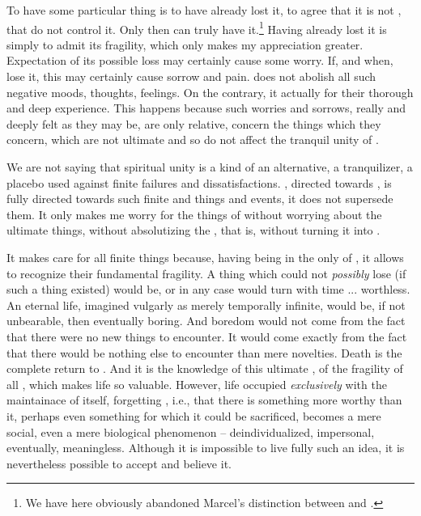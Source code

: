 \pa To have some particular thing is to have already lost it, to agree
that it is not , that  do not control it. Only then can
 truly have it.\footnote{We have here obviously abandoned
Marcel's distinction between  and .}  Having
already lost it is simply to admit its fragility, which only makes my
appreciation greater.  Expectation of its possible loss may certainly
cause  some worry.  If, and when,   lose it,
this may certainly cause sorrow and pain.   does not
abolish all such negative moods, thoughts, feelings. On the contrary,
it actually   for their thorough and deep
experience. This happens because such worries and sorrows, really and
deeply felt as they may be, are only relative, concern the things
which they concern, which are not ultimate and so do not affect the
tranquil unity of .

We are not saying that spiritual unity is a
kind of an alternative, a tranquilizer, a placebo used against finite
failures and  dissatisfactions. , directed
towards , is fully directed towards such finite and
 things and events, it does not supersede them. It only
makes me worry for the things of  without worrying
about the ultimate things, without absolutizing the , that
is, without turning it into .

It makes  care for all finite things because, having
  being in the only  of
, it allows  to recognize their fundamental
fragility. A thing which  could not {\em possibly} lose (if such a
thing existed) would be, or in any case would turn with time
... worthless. An eternal life, imagined vulgarly as merely temporally
infinite, would be, if not unbearable, then eventually boring. And
boredom would not come from the fact that there were no new things to
encounter. It would come exactly from the fact that there would be
nothing else to encounter than mere novelties.
Death is the complete return to . And it is the
knowledge of this ultimate , of the fragility of all
, which makes life so valuable. However, life occupied
{\em exclusively} with the maintainace of itself, forgetting ,
i.e., that there is something more worthy than it, perhaps even something
for which it could be sacrificed, becomes a mere social, even a mere
biological phenomenon -- deindividualized, impersonal, eventually,
meaningless. Although it is impossible to live fully such an idea, it is
nevertheless possible to accept and believe it. 


